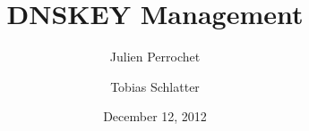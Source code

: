 \documentclass[a4paper, twocolumns]{scrartcl}
\title{DNSKEY Management}
\author{Julien Perrochet \and Tobias Schlatter}
\date{December 12, 2012}
\begin{document}
\maketitle

\nocite{*}



\end{document}
